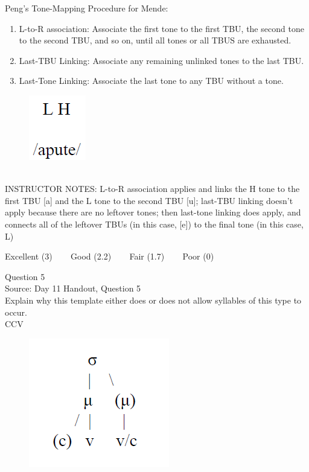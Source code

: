 \documentclass[12pt]{article}
\begin{document}
Peng’s Tone-Mapping Procedure for Mende: \begin{enumerate} \item L-to-R association: Associate the first tone to the first TBU, the second tone to the second TBU, and so on, until all tones or all TBUS are exhausted. \item Last-TBU Linking: Associate any remaining unlinked tones to the last TBU. \item Last-Tone Linking: Associate the last tone to any TBU without a tone. \end{enumerate}

\begin{figure}[H]
\includegraphics{../images/mendetone_c.png}
\end{figure}

~\\
INSTRUCTOR NOTES: L-to-R association applies and links the H tone to the first TBU [a] and the L tone to the second TBU [u]; last-TBU linking doesn't apply because there are no leftover tones; then last-tone linking does apply, and connects all of the leftover TBUs (in this case, [e]) to the final tone (in this case, L)


\vfill
Excellent (3) ~~~ Good (2.2) ~~~ Fair (1.7) ~~~ Poor (0)
\newpage

{\large Question 5}\\

Source: Day 11 Handout, Question 5\\

Explain why this template either does or does not allow syllables of this type to occur.\\

CCV

\begin{figure}[H]
\includegraphics{../images/ponapean_syllabletemplate.png}
\end{figure}
\end{document}
